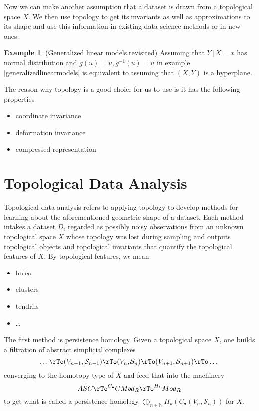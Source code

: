 \documentclass[12pt]{amsart}
\theoremstyle{definition}
\newtheorem{example}[theorem]{Example}
\begin{document}
Now we can make another assumption that a dataset is drawn from a topological space $X$. We then use topology to get its invariants as well as approximations to its shape and use this information in existing data science methods or in new ones.

\begin{example} (Generalized linear models revisited) Assuming that $Y \,|\, X = x$ has normal distribution and $g(u) = u, g^{-1}(u) = u$ in example \ref{generalizedlinearmodels} is equivalent to assuming that $(X, Y)$ is a hyperplane.
\end{example}

The reason why topology is a good choice for us to use is it has the following properties
\begin{itemize}
\item coordinate invariance
\item deformation invariance
\item compressed representation
\end{itemize}

\section{Topological Data Analysis} Topological data analysis refers to applying topology to develop methods for learning about the aforementioned geometric shape of a dataset. Each method intakes a dataset $D$, regarded as possibly noisy observations from an unknown topological space $X$ whose topology was lost during sampling and outputs topological objects and topological invariants that quantify the topological features of $X$. By topological features, we mean
\begin{itemize}
\item holes
\item clusters
\item tendrils
\item \dots
\end{itemize}

The first method is persistence homology. Given a topological space $X$, one builds a filtration of abstract simplicial complexes
$$\dots \rTo (V_{n-1}, \mathcal{S}_{n-1}) \rTo (V_n, \mathcal{S}_n) \rTo (V_{n+1}, \mathcal{S}_{n+1}) \rTo \dots$$
converging to the homotopy type of $X$ and feed that into the machinery
$$ASC \rTo^{C_{\bullet}} CMod_R \rTo^{H_k} Mod_R$$
to get what is called a persistence homology $\bigoplus \limits_{n \in \mathbb{N}} H_k(C_{\bullet}(V_n, \mathcal{S}_n))$ for $X$.
\end{document}

